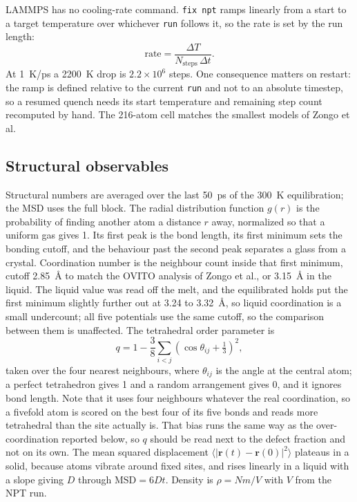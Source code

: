 \documentclass[11pt]{article}
\begin{document}
LAMMPS has no cooling-rate command. \texttt{fix npt} ramps linearly from a start to a target temperature over whichever \texttt{run} follows it, so the rate is set by the run length:
\begin{equation}
    \text{rate} = \frac{\Delta T}{N_{\text{steps}}\,\Delta t}.
    \label{eq:rate}
\end{equation}
At 1~K/ps a 2200~K drop is $2.2\times10^6$ steps. One consequence matters on restart: the ramp is defined relative to the current \texttt{run} and not to an absolute timestep, so a resumed quench needs its start temperature and remaining step count recomputed by hand. The 216-atom cell matches the smallest models of Zongo et al.

\subsection{Structural observables}
Structural numbers are averaged over the last 50~ps of the 300~K equilibration; the MSD uses the full block. The radial distribution function $g(r)$ is the probability of finding another atom a distance $r$ away, normalized so that a uniform gas gives 1. Its first peak is the bond length, its first minimum sets the bonding cutoff, and the behaviour past the second peak separates a glass from a crystal. Coordination number is the neighbour count inside that first minimum, cutoff 2.85~\AA{} to match the OVITO analysis of Zongo et al., or 3.15~\AA{} in the liquid. The liquid value was read off the melt, and the equilibrated holds put the first minimum slightly further out at 3.24 to 3.32~\AA, so liquid coordination is a small undercount; all five potentials use the same cutoff, so the comparison between them is unaffected. The tetrahedral order parameter is
\begin{equation}
    q = 1 - \frac{3}{8}\sum_{i<j}\left(\cos\theta_{ij} + \tfrac{1}{3}\right)^{2},
    \label{eq:top}
\end{equation}
taken over the four nearest neighbours, where $\theta_{ij}$ is the angle at the central atom; a perfect tetrahedron gives 1 and a random arrangement gives 0, and it ignores bond length. Note that it uses four neighbours whatever the real coordination, so a fivefold atom is scored on the best four of its five bonds and reads more tetrahedral than the site actually is. That bias runs the same way as the over-coordination reported below, so $q$ should be read next to the defect fraction and not on its own. The mean squared displacement $\langle|\mathbf{r}(t)-\mathbf{r}(0)|^2\rangle$ plateaus in a solid, because atoms vibrate around fixed sites, and rises linearly in a liquid with a slope giving $D$ through $\mathrm{MSD}=6Dt$. Density is $\rho=Nm/V$ with $V$ from the NPT run.
\end{document}
